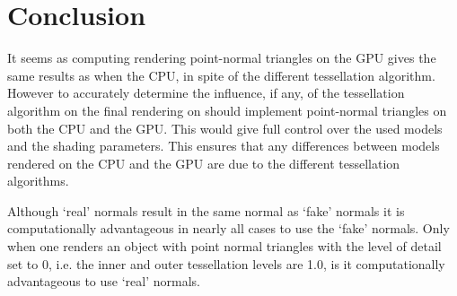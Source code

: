 
\section{Conclusion}
\label{s:conclusion}
	It seems as computing rendering point-normal triangles on the GPU gives the same results as when the CPU, in spite of the different tessellation algorithm. However to accurately determine the influence, if any, of the tessellation algorithm on the final rendering on should implement point-normal triangles on both the CPU and the GPU. This would give full control over the used models and the shading parameters. This ensures that any differences between models rendered on the CPU and the GPU are due to the different tessellation algorithms.

	Although `real' normals result in the same normal as `fake' normals it is computationally advantageous in nearly all cases to use the `fake' normals. Only when one renders an object with point normal triangles with the level of detail set to 0, i.e. the inner and outer tessellation levels are 1.0, is it computationally advantageous to use `real' normals.